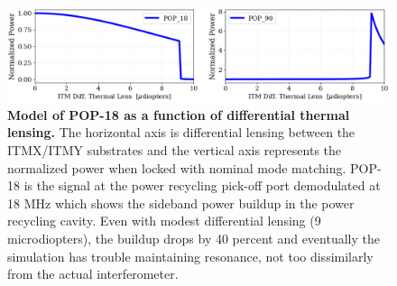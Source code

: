 \begin{figure}[ht]
	\centering
	\includegraphics[width=1.0 \textwidth]{../Figures/POP18_POP90_DiffLens.png}
	\caption[Model of POP-18 as a function of differential thermal lensing.]  
	{\textbf{Model of POP-18 as a function of differential thermal lensing.}
		The horizontal axis is differential lensing between the ITMX/ITMY substrates and the vertical axis represents the normalized power when locked with nominal mode matching.  POP-18 is the signal at the power recycling pick-off port demodulated at 18 MHz which shows the sideband power buildup in the power recycling cavity.  Even with modest differential lensing (9 microdiopters), the buildup drops by 40 percent and eventually the simulation has trouble maintaining resonance, not too dissimilarly from the actual interferometer. 
	}
	\label{fig:POP18_POP90}
\end{figure}

